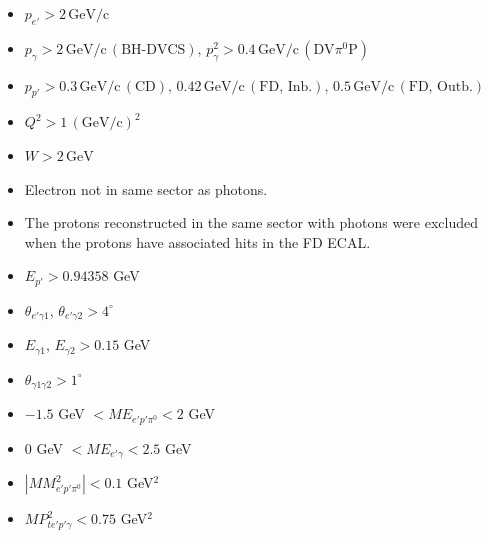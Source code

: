     \begin{itemize}
    \item $p_{e'} > 2 \, \text{GeV/c}$
    \item $p_{\gamma} > 2 \, \text{GeV/c} \, (\text{BH-DVCS}), \, p_{\gamma}^{2} > 0.4 \, \text{GeV/c} \, (\text{DV}\pi^{0}\text{P})$
    \item $p_{p'} > 0.3 \, \text{GeV/c} \, (\text{CD}), \, 0.42 \, \text{GeV/c} \, (\text{FD, Inb.}), \, 0.5 \, \text{GeV/c} \, (\text{FD, Outb.})$
    \item $Q^{2} > 1 \, (\text{GeV/c})^{2}$
    \item $W > 2 \, \text{GeV}$
    \item Electron not in same sector as photons. 
    \item The protons reconstructed in the same sector with photons were excluded when the protons have associated hits in the FD ECAL.
    \item $E_{p'} > 0.94358$ GeV
    \item $\theta_{e'\gamma1}$, $\theta_{e'\gamma2} > 4^{\circ}$
    \item $E_{\gamma1}$, $E_{\gamma2} > 0.15$ GeV
    \item $\theta_{\gamma1\gamma2} > 1^{\circ}$
    \item $-1.5$ GeV $< ME_{e'p'\pi^{0}} < 2$ GeV
    \item $0$ GeV $< ME_{e'\gamma} < 2.5$ GeV
    \item $|MM^{2}_{e'p'\pi^{0}}| < 0.1$ GeV$^{2}$
    \item $MP^{2}_{te'p'\gamma} < 0.75$ GeV$^{2}$
    

    \end{itemize}


